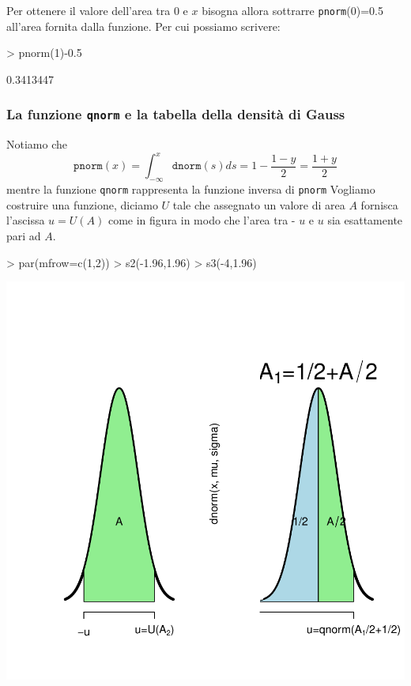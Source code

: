 \documentclass[onecolumn,12pt]{book}
\begin{document}
Per ottenere il valore dell'area tra 0 e $x$ bisogna allora sottrarre \texttt{pnorm}(0)=0.5 all'area fornita dalla funzione.
Per cui possiamo scrivere:
\begin{Schunk}
\begin{Sinput}
> pnorm(1)-0.5
\end{Sinput}
\begin{Soutput}
[1] 0.3413447
\end{Soutput}
\end{Schunk}


\subsubsection{La funzione \texttt{qnorm} e la tabella della densit\`a di Gauss}
Notiamo che $$\texttt{pnorm}(x)=\int_{-\infty}^x \texttt{dnorm}(s)ds=1-\frac{1-y}{2}=\frac{1+y}{2}$$ mentre la funzione \texttt{qnorm} rappresenta la funzione inversa di \texttt{pnorm} 
Vogliamo costruire una funzione, diciamo $U$ tale che assegnato un valore di area $A$   fornisca l'ascissa $u=U(A)$ come in figura in modo che l'area tra - $u$ e $u$ sia esattamente pari ad $A$.  




 
\begin{Schunk}
\begin{Sinput}
> par(mfrow=c(1,2))
> s2(-1.96,1.96)
> s3(-4,1.96)
\end{Sinput}
\end{Schunk}
\includegraphics{RbookParte2-072}
 
\end{document}
